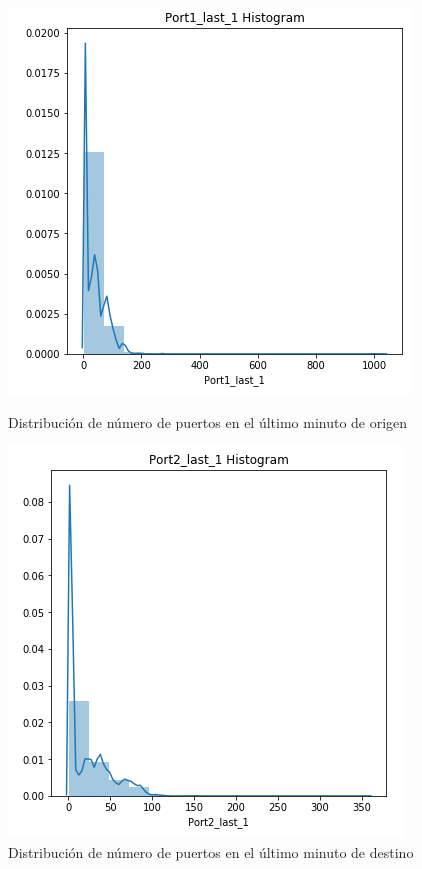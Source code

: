 \begin{figure}[H]
   \begin{minipage}{0.48\textwidth}
     \centering
     \includegraphics[width=0.8\linewidth]{figs/port1_last.PNG}
     \caption{Distribución de número de puertos en el último minuto de origen}
     \label{Fig:port_time1}
   \end{minipage}\hfill
   \begin{minipage}{0.48\textwidth}
     \centering
     \includegraphics[width=0.8\linewidth]{figs/port2_last.PNG}
     \caption{Distribución de número de puertos en el último minuto de destino}
     \label{Fig:port_time2}
   \end{minipage}
\end{figure}


